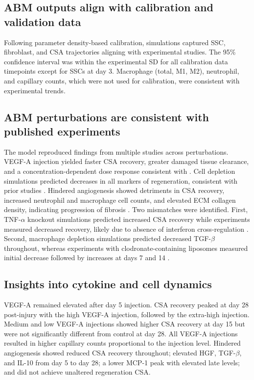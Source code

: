 \documentclass[11pt]{article}
\begin{document}
\subsection{ABM outputs align with calibration and validation data}
Following parameter density-based calibration, simulations captured SSC, fibroblast, and CSA trajectories aligning with experimental studies. The 95\% confidence interval was within the experimental SD for all calibration data timepoints except for SSCs at day 3. Macrophage (total, M1, M2), neutrophil, and capillary counts, which were not used for calibration, were consistent with experimental trends.

\subsection{ABM perturbations are consistent with published experiments}
The model reproduced findings from multiple studies across perturbations. VEGF-A injection yielded faster CSA recovery, greater damaged tissue clearance, and a concentration-dependent dose response consistent with \citep{r73}. Cell depletion simulations predicted decreases in all markers of regeneration, consistent with prior studies \citep{r73,r109,r110}. Hindered angiogenesis showed detriments in CSA recovery, increased neutrophil and macrophage cell counts, and elevated ECM collagen density, indicating progression of fibrosis \citep{r111}. Two mismatches were identified. First, TNF-$\alpha$ knockout simulations predicted increased CSA recovery while experiments measured decreased recovery, likely due to absence of interferon cross-regulation \citep{r112}. Second, macrophage depletion simulations predicted decreased TGF-$\beta$ throughout, whereas experiments with clodronate-containing liposomes measured initial decrease followed by increases at days 7 and 14 \citep{r110}.

\subsection{Insights into cytokine and cell dynamics}
VEGF-A remained elevated after day 5 injection. CSA recovery peaked at day 28 post-injury with the high VEGF-A injection, followed by the extra-high injection. Medium and low VEGF-A injections showed higher CSA recovery at day 15 but were not significantly different from control at day 28. All VEGF-A injections resulted in higher capillary counts proportional to the injection level. Hindered angiogenesis showed reduced CSA recovery throughout; elevated HGF, TGF-$\beta$, and IL-10 from day 5 to day 28; a lower MCP-1 peak with elevated late levels; and did not achieve unaltered regeneration CSA.
\end{document}
